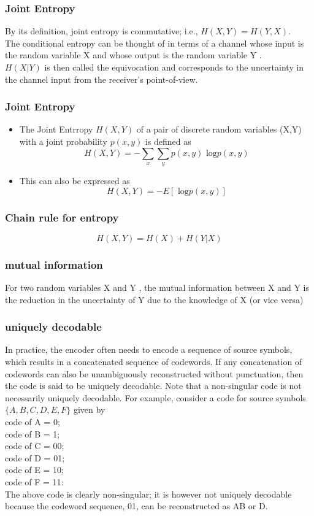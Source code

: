 \begin{frame}

\frametitle{Joint Entropy}
By its definition, joint entropy is commutative; i.e., $H(X,Y ) = H(Y,X)$.
\\
The conditional entropy can be thought of in terms of a channel whose input
is the random variable X and whose output is the random variable Y . \\

$H(X|Y )$ is
then called the equivocation and corresponds to the uncertainty in the channel
input from the receiver's point-of-view.
\end{frame}
\begin{frame}

\frametitle{Joint Entropy}
\begin{itemize}
	\item The Joint Entrropy $H(X,Y)$ of a pair of discrete random variables (X,Y) with a joint probability $p(x,y)$ is defined as
	\[ H(X,Y) = -\sum_x \sum_y p(x,y) \mbox{ log}p(x,y)\]
	\item This can also be expressed as 
	\[ H(X,Y) = - E[\mbox{ log}p(x,y)]\]
\end{itemize}
\end{frame}
\begin{frame}
\frametitle{Chain rule for entropy}
\[H(X, Y ) = H(X) + H(Y |X)\]
\end{frame}


\begin{frame}
\frametitle{mutual information}
For two random variables X and Y , the mutual information between X and
Y is the reduction in the uncertainty of Y due to the knowledge of X (or vice
versa)
\end{frame}

\begin{frame}
\frametitle{uniquely decodable}
In practice, the encoder often needs to encode a sequence of source symbols,
which results in a concatenated sequence of codewords. If any concatenation of
codewords can also be unambiguously reconstructed without punctuation, then
the code is said to be uniquely decodable. Note that a non-singular code is not
necessarily uniquely decodable. For example, consider a code for source symbols
$\{A,B,C,D,E, F \}$ given by\\
code of A = 0;\\
code of B = 1;\\
code of C = 00;\\
code of D = 01;\\
code of E = 10;\\
code of F = 11:\\
The above code is clearly non-singular; it is however not uniquely decodable
because the codeword sequence, 01, can be reconstructed as AB or D.
\end{frame}



